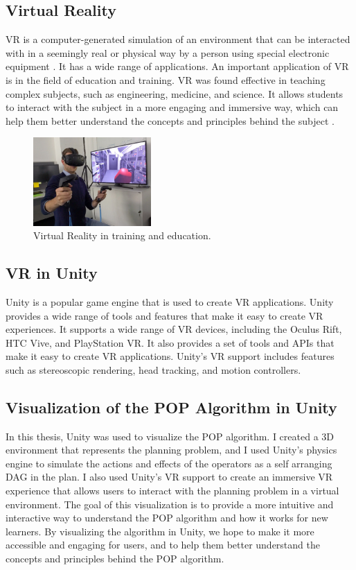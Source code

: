 \subsection{Virtual Reality} \label{subsec:virtual_reality}
\acf{VR} is a computer-generated simulation of an environment that can be interacted with in a seemingly real or physical way by a person using special electronic equipment \cite{WikiVR}. It has a wide range of applications. An important application of \ac{VR} is in the field of education and training. \ac{VR} was found effective in teaching complex subjects, such as engineering, medicine, and science. It allows students to interact with the subject in a more engaging and immersive way, which can help them better understand the concepts and principles behind the subject \cite{VRapps}\cite{WikiVR}.

\begin{figure}[H]
    \centering
    \includegraphics[width=0.4\textwidth]{images/VR.jpg}
    \caption{Virtual Reality in training and education. \cite{WikiVR}}
    \label{fig:vr_training}
\end{figure}


\subsection{\acf{VR} in Unity} \label{subsec:vr_in_unity}
Unity is a popular game engine that is used to create \ac{VR} applications. Unity provides a wide range of tools and features that make it easy to create \ac{VR} experiences. It supports a wide range of \ac{VR} devices, including the Oculus Rift, HTC Vive, and PlayStation \ac{VR}. It also provides a set of tools and APIs that make it easy to create \ac{VR} applications. Unity's \ac{VR} support includes features such as stereoscopic rendering, head tracking, and motion controllers.
\subsection{Visualization of the \acf{POP} Algorithm in Unity} \label{subsec:visualization_pop_unity}
In this thesis, Unity was used to visualize the \ac{POP} algorithm.
I created a 3D environment that represents the planning problem, and I used Unity's physics engine to simulate the actions and effects of the operators as a self arranging \ac{DAG} in the plan. I also used Unity's \ac{VR} support to create an immersive \ac{VR} experience that allows users to interact with the planning problem in a virtual environment. The goal of this visualization is to provide a more intuitive and interactive way to understand the \ac{POP} algorithm and how it works for new learners. By visualizing the algorithm in Unity, we hope to make it more accessible and engaging for users, and to help them better understand the concepts and principles behind the \ac{POP} algorithm.

